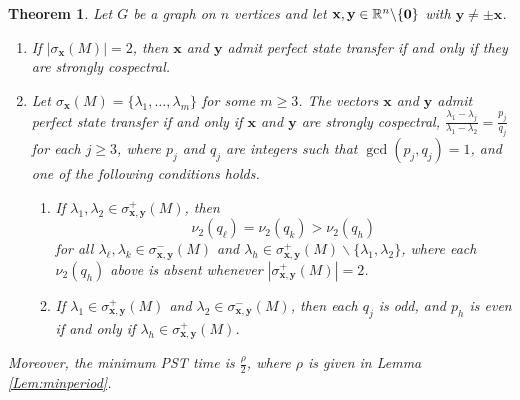 \documentclass[11pt]{article}
\newtheorem{theorem}{Theorem}
\newcommand{\zero}{{\bf{0}}}
\newcommand{\bx}{\mathbf x}
\newcommand{\by}{\mathbf y}
\def\R{\mathbb{R}}
\begin{document}
\begin{theorem}
\label{Thm:PSTchar}
Let $G$ be a graph on $n$ vertices and let $\bx,\by \in \R^n\backslash\{\zero\}$ with $\by \ne \pm \bx$.
\begin{enumerate}
\item If $|\sigma_{\bx}(M)|=2$, then $\bx$ and $\by$ admit perfect state transfer if and only if they are strongly cospectral.
\item Let $\sigma_{\bx}(M)=\{\lambda_1,\ldots,\lambda_m\}$ for some $m\geq 3$. The vectors $\bx$ and $\by$ admit perfect state transfer if and only if $\bx$ and $\by$ are strongly cospectral, $\frac{\lambda_1-\lambda_j}{\lambda_1-\lambda_2}=\frac{p_j}{q_j}$ for each $j\geq 3$, where $p_j$ and $q_j$ are integers such that $\operatorname{gcd}(p_j,q_j)=1$, and one of the following conditions holds.
\begin{enumerate}
\item If $\lambda_1,\lambda_2\in\sigma_{\bx,\by}^+(M)$, then $$\nu_2(q_{\ell})=\nu_2(q_{k})>\nu_2(q_h)$$ for all $\lambda_{\ell},\lambda_k\in \sigma_{\bx,\by}^-(M)$ and $\lambda_h\in \sigma_{\bx,\by}^+(M)\backslash\{\lambda_1,\lambda_2\}$, where each $\nu_2(q_h)$ above is absent whenever $|\sigma_{\bx,\by}^+(M)|=2$.
\item If $\lambda_1\in\sigma_{\bx,\by}^+(M)$ and $\lambda_2\in\sigma_{\bx,\by}^-(M)$, then each $q_j$ is odd, and $p_h$ is even if and only if $\lambda_h\in\sigma_{\bx,\by}^+(M)$.
\end{enumerate}
\end{enumerate}
Moreover, the minimum PST time is $\frac{\rho}{2}$, where $\rho$ is given in Lemma \ref{Lem:minperiod}.
\end{theorem}
\end{document}
